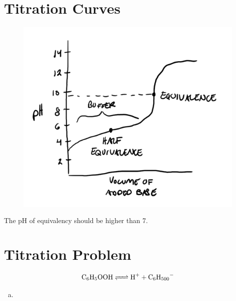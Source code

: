 \documentclass{article}
\begin{document}
\section{Titration Curves}
\begin{figure}[H]
    \centering
    \includegraphics[scale=1]{"Figure 1"}
\end{figure}

The pH of equivalency should be higher than 7.

\section{Titration Problem}
$$\ce{C_6H_5OOH <=> H+ + C_6H_500-}$$

\begin{enumerate}[(a)]
    \item 
\end{enumerate}
\end{document}
